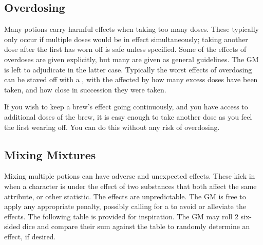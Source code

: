 \subsection{Overdosing}

Many potions carry harmful effects when taking too many doses.
These typically only occur if multiple doses would be in effect simultaneously; taking another dose after the first has worn off is safe unless specified.
Some of the effects of overdoses are given explicitly, but many are given as general guidelines.
The GM is left to adjudicate in the latter case.
Typically the worst effects of overdosing can be staved off with a  {\test}, with the {\tn} affected by how many excess doses have been taken, and how close in succession they were taken.

If you wish to keep a brew's effect going continuously, and you have access to additional doses of the brew, it is easy enough to take another dose as you feel the first wearing off.
You can do this without any risk of overdosing.

\subsection{Mixing Mixtures}

Mixing multiple potions can have adverse and unexpected effects.
These kick in when a character is under the effect of two substances that both affect the same attribute, or other statistic.
The effects are unpredictable.
The GM is free to apply any appropriate penalty, possibly calling for a  {\test} to avoid or alleviate the effects.
The following table is provided for inspiration.
The GM may roll 2 six-sided dice and compare their sum against the table to randomly determine an effect, if desired.


